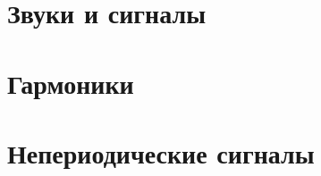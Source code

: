 \section{Звуки и сигналы}

\newpage

\section{Гармоники}

\newpage

\section{Непериодические сигналы}

\newpage

